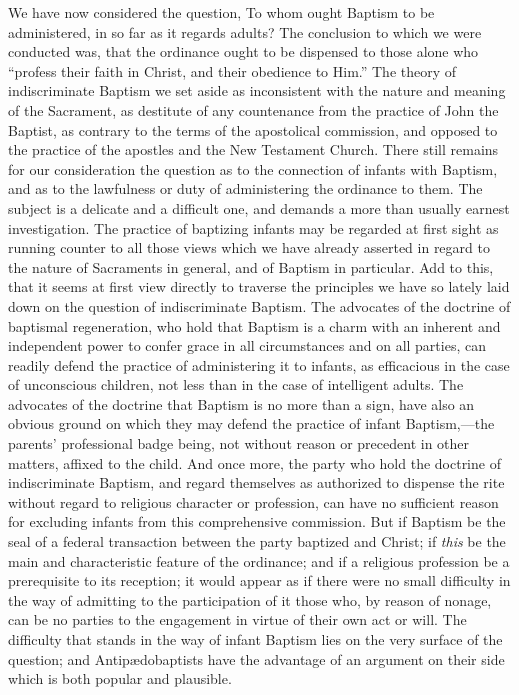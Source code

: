 \documentclass[
]{book}
\begin{document}
We have now considered the question, To whom ought Baptism to be administered, in so far as it regards adults? The conclusion to which we were conducted was, that the ordinance ought to be dispensed to those alone who ``profess their faith in Christ, and their obedience to Him.'' The theory of indiscriminate Baptism we set aside as inconsistent with the nature and meaning of the Sacrament, as destitute of any countenance from the practice of John the Baptist, as contrary to the terms of the apostolical commission, and opposed to the practice of the apostles and the New Testament Church. There still remains for our consideration the question as to the connection of infants with Baptism, and as to the lawfulness or duty of administering the ordinance to them. The subject is a delicate and a difficult one, and demands a more than usually earnest investigation. The practice of baptizing infants may be regarded at first sight as running counter to all those views which we have already asserted in regard to the nature of Sacraments in general, and of Baptism in particular. Add to this, that it seems at first view directly to traverse the principles we have so lately laid down on the question of indiscriminate Baptism. The advocates of the doctrine of baptismal regeneration, who hold that Baptism is a charm with an inherent and independent power to confer grace in all circumstances and on all parties, can readily defend the practice of administering it to infants, as efficacious in the case of unconscious children, not less than in the case of intelligent adults. The advocates of the doctrine that Baptism is no more than a sign, have also an obvious ground on which they may defend the practice of infant Baptism,---the parents' professional badge being, not without reason or precedent in other matters, affixed to the child. And once more, the party who hold the doctrine of indiscriminate Baptism, and regard themselves as authorized to dispense the rite without regard to religious character or profession, can have no sufficient reason for excluding infants from this comprehensive commission. But if Baptism be the seal of a federal transaction between the party baptized and Christ; if \emph{this} be the main and characteristic feature of the ordinance; and if a religious profession be a prerequisite to its reception; it would appear as if there were no small difficulty in the way of admitting to the participation of it those who, by reason of nonage, can be no parties to the engagement in virtue of their own act or will. The difficulty that stands in the way of infant Baptism lies on the very surface of the question; and Antipædobaptists have the advantage of an argument on their side which is both popular and plausible.
\end{document}
